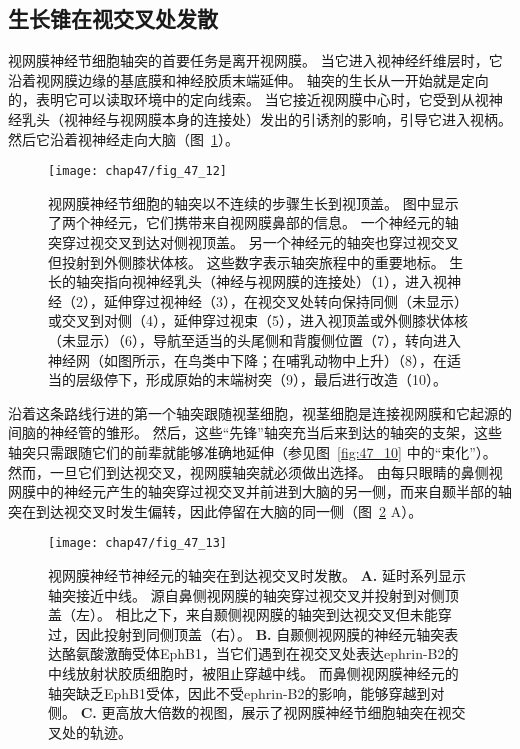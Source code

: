\subsection{生长锥在视交叉处发散}

视网膜神经节细胞轴突的首要任务是离开视网膜。
当它进入视神经纤维层时，它沿着视网膜边缘的基底膜和神经胶质末端延伸。
轴突的生长从一开始就是定向的，表明它可以读取环境中的定向线索。
当它接近视网膜中心时，它受到从视神经乳头（视神经与视网膜本身的连接处）发出的引诱剂的影响，引导它进入视柄。
然后它沿着视神经走向大脑（图~\ref{fig:47_12}）。


\begin{figure}[htbp]
	\centering
	\texttt{[image: chap47/fig\_47\_12]}
	\caption{视网膜神经节细胞的轴突以不连续的步骤生长到视顶盖。
		图中显示了两个神经元，它们携带来自视网膜鼻部的信息。
		一个神经元的轴突穿过视交叉到达对侧视顶盖。
		另一个神经元的轴突也穿过视交叉但投射到外侧膝状体核。
		这些数字表示轴突旅程中的重要地标。
		生长的轴突指向视神经乳头（神经与视网膜的连接处）（1），进入视神经（2），延伸穿过视神经（3），在视交叉处转向保持同侧（未显示）或交叉到对侧（4），延伸穿过视束（5），进入视顶盖或外侧膝状体核（未显示）（6），导航至适当的头尾侧和背腹侧位置（7），转向进入神经网（如图所示，在鸟类中下降；在哺乳动物中上升）（8），在适当的层级停下，形成原始的末端树突（9），最后进行改造（10）。}
	\label{fig:47_12}
\end{figure}


沿着这条路线行进的第一个轴突跟随视茎细胞，视茎细胞是连接视网膜和它起源的间脑的神经管的雏形。
然后，这些“先锋”轴突充当后来到达的轴突的支架，这些轴突只需跟随它们的前辈就能够准确地延伸（参见图~\ref{fig:47_10} 中的“束化”）。
然而，一旦它们到达视交叉，视网膜轴突就必须做出选择。
由每只眼睛的鼻侧视网膜中的神经元产生的轴突穿过视交叉并前进到大脑的另一侧，而来自颞半部的轴突在到达视交叉时发生偏转，因此停留在大脑的同一侧（图~\ref{fig:47_13} A）。


\begin{figure}[htbp]
	\centering
	\texttt{[image: chap47/fig\_47\_13]}
	\caption{视网膜神经节神经元的轴突在到达视交叉时发散。
		\textbf{A.} 延时系列显示轴突接近中线。
		源自鼻侧视网膜的轴突穿过视交叉并投射到对侧顶盖（左）。
		相比之下，来自颞侧视网膜的轴突到达视交叉但未能穿过，因此投射到同侧顶盖（右）。
		\textbf{B.} 自颞侧视网膜的神经元轴突表达酪氨酸激酶受体EphB1，当它们遇到在视交叉处表达ephrin-B2的中线放射状胶质细胞时，被阻止穿越中线。
		而鼻侧视网膜神经元的轴突缺乏EphB1受体，因此不受ephrin-B2的影响，能够穿越到对侧。
		\textbf{C.}  更高放大倍数的视图，展示了视网膜神经节细胞轴突在视交叉处的轨迹。}
	\label{fig:47_13}
\end{figure}


